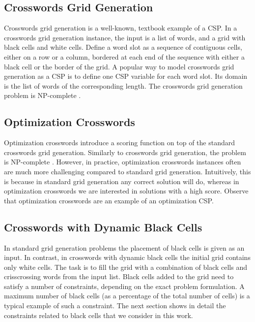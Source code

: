 \subsection{Crosswords Grid Generation}

Crosswords grid generation is a well-known, textbook example of a CSP.
In a crosswords grid generation instance, the input is a list of words, and 
a grid with black cells and white cells.
Define a word slot as a sequence of contiguous cells, either on a row or a column,
bordered at each end of the sequence with either a black cell or the border of the grid.
A popular way to model crosswords grid generation as a CSP is to 
define one CSP variable for each word slot.
Its domain is the list of words of the corresponding length.
The crosswords grid generation problem is NP-complete \cite{garey1979computers,10.1007/978-3-642-30347-0_15}.

\subsection{Optimization Crosswords}

Optimization crosswords introduce a scoring function on top of the 
standard crosswords grid generation.
Similarly to crosswords grid generation, the problem is NP-complete \cite{DBLP:conf/socs/BoteaB21}.
However, in practice, optimization crosswords instances often are much more
challenging compared to standard grid generation.
Intuitively, this is because in standard grid generation any correct solution will do,
whereas in optimization crosswords we are interested in solutions with a high score.
Observe that optimization crosswords are an example of an optimization CSP.

\subsection{Crosswords with Dynamic Black Cells}

In standard grid generation problems the placement of black cells is
given as an input.
In contrast, in crosswords with dynamic black cells the initial grid contains 
only white cells. 
The task is to fill the grid with a combination of black cells
and crisscrossing words from the input list.
Black cells added to the grid need to satisfy a number of constraints,
depending on the exact problem formulation.
A maximum number of black cells (as a percentage of the total number of cells)
is a typical example of such a constraint.
The next section shows in detail the constraints related to black cells 
that we consider in this work.

